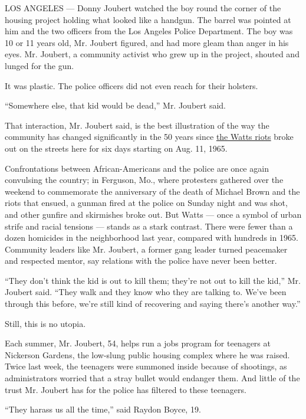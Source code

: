LOS ANGELES --- Donny Joubert watched the boy round the corner of the
housing project holding what looked like a handgun. The barrel was
pointed at him and the two officers from the Los Angeles Police
Department. The boy was 10 or 11 years old, Mr. Joubert figured, and had
more gleam than anger in his eyes. Mr. Joubert, a community activist who
grew up in the project, shouted and lunged for the gun.

It was plastic. The police officers did not even reach for their
holsters.

``Somewhere else, that kid would be dead,'' Mr. Joubert said.

That interaction, Mr. Joubert said, is the best illustration of the way
the community has changed significantly in the 50 years since
\href{https://www.youtube.com/watch?v=Au9oohI1MuM}{the Watts riots}
broke out on the streets here for six days starting on Aug. 11, 1965.

Confrontations between African-Americans and the police are once again
convulsing the country; in Ferguson, Mo., where protesters gathered over
the weekend to commemorate the anniversary of the death of Michael Brown
and the riots that ensued, a gunman fired at the police on Sunday night
and was shot, and other gunfire and skirmishes broke out. But Watts ---
once a symbol of urban strife and racial tensions --- stands as a stark
contrast. There were fewer than a dozen homicides in the neighborhood
last year, compared with hundreds in 1965. Community leaders like Mr.
Joubert, a former gang leader turned peacemaker and respected mentor,
say relations with the police have never been better.

``They don't think the kid is out to kill them; they're not out to kill
the kid,'' Mr. Joubert said. ``They walk and they know who they are
talking to. We've been through this before, we're still kind of
recovering and saying there's another way.''

Still, this is no utopia.

Each summer, Mr. Joubert, 54, helps run a jobs program for teenagers at
Nickerson Gardens, the low-slung public housing complex where he was
raised. Twice last week, the teenagers were summoned inside because of
shootings, as administrators worried that a stray bullet would endanger
them. And little of the trust Mr. Joubert has for the police has
filtered to these teenagers.

``They harass us all the time,'' said Raydon Boyce, 19.

\href{https://www.nytimes.com/interactive/2015/08/05/us/watts-riots-archives.html}{}

